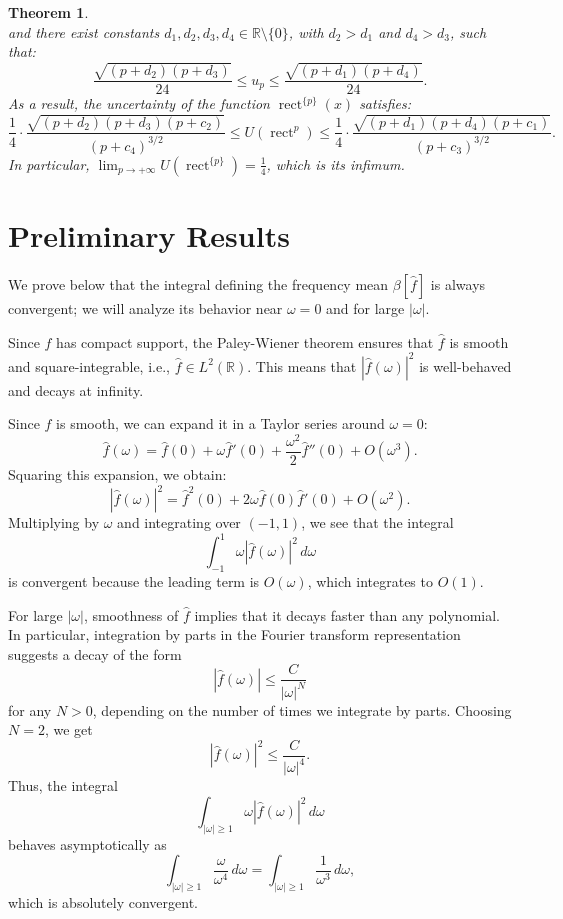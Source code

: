 \documentclass[preprint,hidelinks,authoryear]{elsarticle}
\newtheorem{Thm}{Theorem}[section]
\theoremstyle{plain}
\theoremstyle{definition}
\theoremstyle{remark}
\begin{document}
{\begin{Thm}
\begin{equation}
\end{equation}
and there exist constants $d_1, d_2, d_3, d_4 \in \mathbb{R} \setminus \{0\}$, with $d_2 > d_1$ and $d_4 > d_3$, such that:
\begin{equation}
\frac{\sqrt{(p + d_2)(p + d_3)}}{24} \le u_p \le \frac{\sqrt{(p + d_1)(p + d_4)}}{24} .\label{disrapportospaziale}
\end{equation}
As a result, the uncertainty of the function $\operatorname{rect}^{\{p\}}(x)$ satisfies:
\begin{equation}
\frac{1}{4} \cdot \frac{\sqrt{(p + d_2)(p + d_3)(p + c_2)}}{(p + c_4)^{3/2}} \le U(\operatorname{rect}^{{p}}) \le \frac{1}{4} \cdot \frac{\sqrt{(p + d_1)(p + d_4)(p + c_1)}}{(p + c_3)^{3/2}}. \label{disinceetezza}
\end{equation}
In particular, $\displaystyle\lim_{p \to +\infty} U(\operatorname{rect}^{\{p\}}) = \frac{1}{4}$, which is its infimum.
\label{teo2.6}
\end{Thm}}



\section{Preliminary Results}\label{sec2}




We prove below that the integral defining the frequency mean $ \beta[\hat{f}] $ is always convergent; we will analyze its behavior near $ \omega = 0 $ and for large $ |\omega| $.

Since $ f $ has compact support, the Paley-Wiener theorem ensures that $ \hat{f} $ is smooth and square-integrable, i.e., $ \hat{f} \in L^2(\mathbb{R}) $. This means that $ |\hat{f}(\omega)|^2 $ is well-behaved and decays at infinity.

Since $ \hat{f} $ is smooth, we can expand it in a Taylor series around $ \omega = 0 $:  
$$
\hat{f}(\omega) = \hat{f}(0) + \omega \hat{f}'(0) + \frac{\omega^2}{2} \hat{f}''(0) + O(\omega^3).
$$
Squaring this expansion, we obtain:  
$$
|\hat{f}(\omega)|^2 = \hat{f}^2(0) + 2\omega \hat{f}(0) \hat{f}'(0) + O(\omega^2).
$$
Multiplying by $ \omega $ and integrating over $ (-1,1) $, we see that the integral  
$$
\int_{-1}^{1} \omega |\hat{f}(\omega)|^2 \, d\omega
$$
is convergent because the leading term is $ O(\omega) $, which integrates to $ O(1) $.

For large $ |\omega| $, smoothness of $ \hat{f} $ implies that it decays faster than any polynomial. In particular, integration by parts in the Fourier transform representation suggests a decay of the form  
$$
|\hat{f}(\omega)| \leq \frac{C}{|\omega|^N}
$$
for any $ N > 0 $, depending on the number of times we integrate by parts. Choosing $ N = 2 $, we get  
$$
|\hat{f}(\omega)|^2 \leq \frac{C}{|\omega|^4}.
$$
Thus, the integral  
$$
\int_{|\omega| \geq 1} \omega |\hat{f}(\omega)|^2 \, d\omega
$$
behaves asymptotically as  
$$
\int_{|\omega| \geq 1} \frac{\omega}{\omega^4} \, d\omega = \int_{|\omega| \geq 1} \frac{1}{\omega^3} \, d\omega,
$$
which is absolutely convergent.
\end{document}
